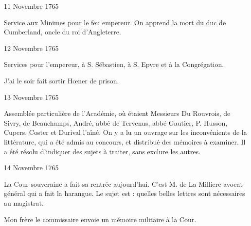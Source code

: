                      \begin{diary}{11 Novembre 1765}{}

                         Service aux Minimes pour le feu empereur.
                           On apprend la mort du duc de
                              Cumberland,
                           oncle du roi d'Angleterre.
                        \bigskip


                     \end{diary}


                     \begin{diary}{12 Novembre 1765}{}

                         Services pour l'empereur, à S. Sébastien, à
                           S. Epvre et à la Congrégation. \bigskip


                         J'ai le soir fait sortir Hœner de prison. \bigskip


                     \end{diary}

                     \begin{diary}{13 Novembre 1765}{}

                         Assemblée particulière de l'Académie, où
                           étaient Messieurs
                           Du Rouvrois, de Sivry, de
                              Beauchamps, André,
                              abbé de Tervenus,
                           abbé Gautier, P. Husson, Cupers, Coster et
                           Durival l'aîné. On y a lu
                              un ouvrage sur
                              les inconvénients de la littérature, qui a été
                           admis au concours, et distribué des mémoires
                           à examiner. Il a été résolu d'indiquer
                           des sujets à traiter, sans exclure les autres. \bigskip


                     \end{diary}

                     \begin{diary}{14 Novembre 1765}{}


                           La Cour souveraine a fait sa
                           rentrée aujourd'hui.
                           C'est M. de La Milliere
                           avocat général qui a fait
                           la harangue. Le sujet
                           est : quelles belles lettres
                           sont nécessaires au magistrat. \bigskip



                           Mon frère le commissaire
                           envoie
                           un
                              mémoire militaire à la Cour. \bigskip


                     \end{diary}

